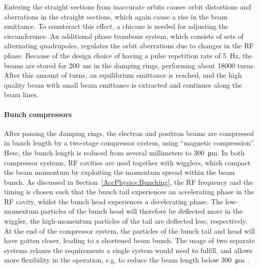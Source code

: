 Entering the straight sections from inaccurate  orbits causes orbit distortions and aberrations in the straight sections, which again cause a rise in the beam emittance.
To counteract this effect, a chicane is needed for adjusting the circumference.
An additional phase trombone system, which consists of sets of alternating quadrupoles, regulates the orbit aberrations due to changes in the RF phase.
Because of the design choice of having a pulse repetition rate of \SI{5}{\hertz}, the beams are stored for \SI{200}{\milli\second} in the damping rings, performing about \num{18000} turns.
After this amount of turns, an equilibrium emittance is reached, and the high quality beam with small beam emittance is extracted and continues along the beam lines. 

\paragraph{Bunch compressors}
After passing the damping rings, the electron and positron beams are compressed in bunch length by a two-stage compressor system, using ``magnetic compression''.
Here, the bunch length is reduced from several millimeters to \SI{300}{\micro\meter}.
In both compressor systems, RF cavities are used together with wigglers, which compact the beam momentum by exploiting the momentum spread within the beam bunch.
As discussed in Section~\ref{AccPhysics:Bunching}, the RF frequency and the timing is chosen such that the bunch tail experiences an accelerating phase in the RF cavity, whilst the bunch head experiences a decelerating phase.
The low-momentum particles of the bunch head will therefore be deflected more in the wiggler, the high-momentum particles of the tail are deflected less, respectively.
At the end of the compressor system, the particles of the bunch tail and head will have gotten closer, leading to a shortened beam bunch. 
The usage of two separate systems relaxes the requirements a single system would need to fulfill,  and allows more flexibility in the operation, e.g. to reduce the beam length below \SI{300}{\micro\meter}~\cite[p. 124]{TDR32}.

